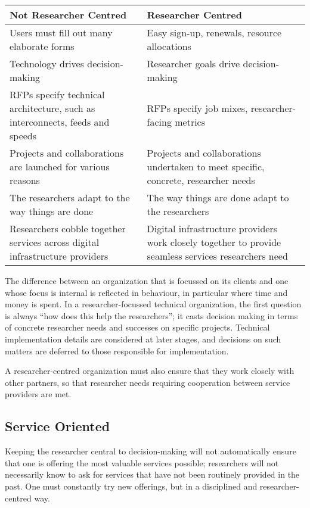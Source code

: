 \documentclass[11pt, letterpaper, twoside]{article}
\begin{document}
\begin{table}[ht]
\centering
\small {\sffamily
{}
\begin{tabular}{P{2.5in}|P{2.5in}}
\textcolor{cdaRed}{\textbf{Not Researcher Centred}} & \textcolor{cdaRed}{\textbf{Researcher Centred}} \\
\hline \hline
Users must fill out many elaborate forms & Easy sign-up, renewals, resource allocations\\
Technology drives decision-making & Researcher goals drive decision-making\\
RFPs specify technical architecture, such as interconnects, feeds and speeds & RFPs specify job mixes, researcher-facing metrics \\
Projects and collaborations are launched for various reasons & Projects and collaborations undertaken to meet specific, concrete, researcher needs\\ 
The researchers adapt to the way things are done & The way things are done adapt to the researchers\\
Researchers cobble together services across digital infrastructure providers & Digital infrastructure providers work closely together to provide seamless services researchers need \\
\hline
\end{tabular}
}
\end{table}

The difference between an organization that is focussed on its clients
and one whose focus is internal is reflected in behaviour, in particular
where time and money is spent. In a researcher-focussed technical
organization, the first question is always ``how does this help the
researchers''; it casts decision making in terms of concrete researcher
needs and successes on specific projects. Technical implementation
details are considered at later stages, and decisions on such matters
are deferred to those responsible for implementation.

A researcher-centred organization must also ensure that they work
closely with other partners, so that researcher needs requiring
cooperation between service providers are met.

\subsection*{Service Oriented}
%

Keeping the researcher central to decision-making will not automatically
ensure that one is offering the most valuable services possible;
researchers will not necessarily know to ask for services that have not
been routinely provided in the past. One must constantly try new
offerings, but in a disciplined and researcher-centred way.
\end{document}

